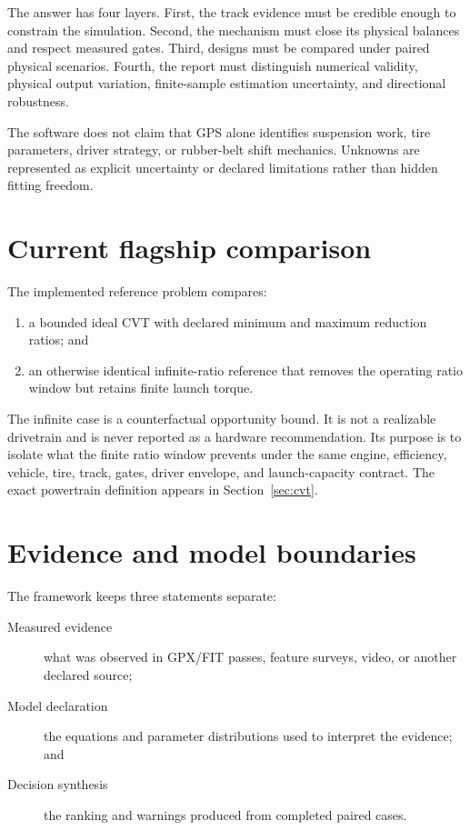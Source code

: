 \documentclass[11pt,oneside]{report}
\begin{document}
The answer has four layers.  First, the track evidence must be credible enough to
constrain the simulation.  Second, the mechanism must close its physical balances and
respect measured gates.  Third, designs must be compared under paired physical
scenarios.  Fourth, the report must distinguish numerical validity, physical output
variation, finite-sample estimation uncertainty, and directional robustness.

The software does not claim that GPS alone identifies suspension work, tire parameters,
driver strategy, or rubber-belt shift mechanics.  Unknowns are represented as explicit
uncertainty or declared limitations rather than hidden fitting freedom.

\section{Current flagship comparison}

The implemented reference problem compares:

\begin{enumerate}
  \item a bounded ideal CVT with declared minimum and maximum reduction ratios; and
  \item an otherwise identical infinite-ratio reference that removes the operating
        ratio window but retains finite launch torque.
\end{enumerate}

The infinite case is a counterfactual opportunity bound.  It is not a realizable
drivetrain and is never reported as a hardware recommendation.  Its purpose is to
isolate what the finite ratio window prevents under the same engine, efficiency,
vehicle, tire, track, gates, driver envelope, and launch-capacity contract.  The exact
powertrain definition appears in Section~\ref{sec:cvt}.

\section{Evidence and model boundaries}

The framework keeps three statements separate:

\begin{description}
  \item[Measured evidence] what was observed in GPX/FIT passes, feature surveys, video, or
  another declared source;
  \item[Model declaration] the equations and parameter distributions used to interpret
  the evidence; and
  \item[Decision synthesis] the ranking and warnings produced from completed paired
  cases.
\end{description}
\end{document}
